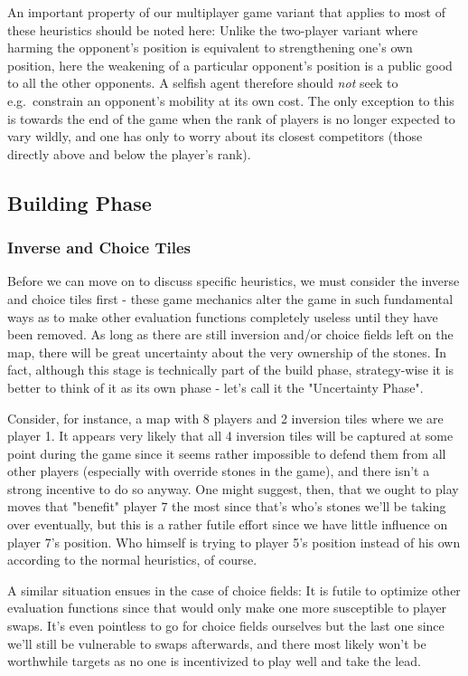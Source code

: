 \documentclass[a4paper,12pt]{article}
\begin{document}
An important property of our multiplayer game variant that applies to most of these heuristics should be noted here: Unlike the two-player variant where harming the opponent's position is equivalent to strengthening one's own position, here the weakening of a particular opponent's position is a public good to all the other opponents. A selfish agent therefore should \emph{not} seek to e.g.\ constrain an opponent's mobility at its own cost. The only exception to this is towards the end of the game when the rank of players is no longer expected to vary wildly, and one has only to worry about its closest competitors (those directly above and below the player's rank).

\subsection{Building Phase}

\subsubsection{Inverse and Choice Tiles}
Before we can move on to discuss specific heuristics, we must consider the inverse and choice tiles first - these game mechanics alter the game in such fundamental ways as to make other evaluation functions completely useless until they have been removed. As long as there are still inversion and/or choice fields left on the map, there will be great uncertainty about the very ownership of the stones. In fact, although this stage is technically part of the build phase, strategy-wise it is better to think of it as its own phase - let's call it the "Uncertainty Phase".

Consider, for instance, a map with 8 players and 2 inversion tiles where we are player 1. It appears very likely that all 4 inversion tiles will be captured at some point during the game since it seems rather impossible to defend them from all other players (especially with override stones in the game), and there isn't a strong incentive to do so anyway. One might suggest, then, that we ought to play moves that "benefit" player 7 the most since that's who's stones we'll be taking over eventually, but this is a rather futile effort since we have little influence on player 7's position. Who himself is trying to  player 5's position instead of his own according to the normal heuristics, of course.

A similar situation ensues in the case of choice fields: It is futile to optimize other evaluation functions since that would only make one more susceptible to player swaps. It's even pointless to go for choice fields ourselves but the last one since we'll still be vulnerable to swaps afterwards, and there most likely won't be worthwhile targets as no one is incentivized to play well and take the lead.
\end{document}
